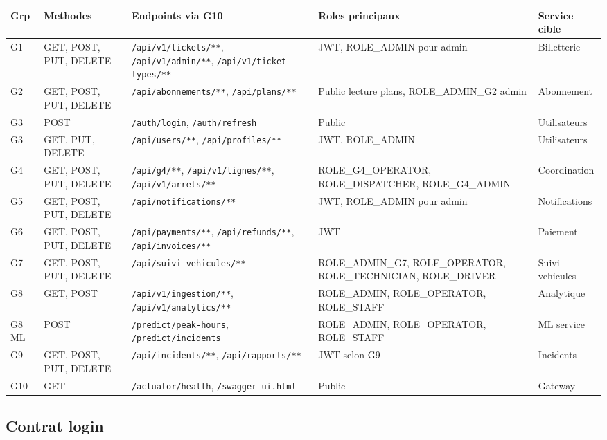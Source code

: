 \documentclass[12pt,a4paper]{article}
\begin{document}
\begin{longtable}{p{1.3cm}p{2cm}p{5.4cm}p{3.2cm}p{3.1cm}}
\toprule
\textbf{Grp} & \textbf{Methodes} & \textbf{Endpoints via G10} & \textbf{Roles principaux} & \textbf{Service cible} \\
\midrule
G1 & GET, POST, PUT, DELETE & \texttt{/api/v1/tickets/**}, \texttt{/api/v1/admin/**}, \texttt{/api/v1/ticket-types/**} & JWT, ROLE\_ADMIN pour admin & Billetterie \\
G2 & GET, POST, PUT, DELETE & \texttt{/api/abonnements/**}, \texttt{/api/plans/**} & Public lecture plans, ROLE\_ADMIN\_G2 admin & Abonnement \\
G3 & POST & \texttt{/auth/login}, \texttt{/auth/refresh} & Public & Utilisateurs \\
G3 & GET, PUT, DELETE & \texttt{/api/users/**}, \texttt{/api/profiles/**} & JWT, ROLE\_ADMIN & Utilisateurs \\
G4 & GET, POST, PUT, DELETE & \texttt{/api/g4/**}, \texttt{/api/v1/lignes/**}, \texttt{/api/v1/arrets/**} & ROLE\_G4\_OPERATOR, ROLE\_DISPATCHER, ROLE\_G4\_ADMIN & Coordination \\
G5 & GET, POST, PUT, DELETE & \texttt{/api/notifications/**} & JWT, ROLE\_ADMIN pour admin & Notifications \\
G6 & GET, POST, PUT, DELETE & \texttt{/api/payments/**}, \texttt{/api/refunds/**}, \texttt{/api/invoices/**} & JWT & Paiement \\
G7 & GET, POST, PUT, DELETE & \texttt{/api/suivi-vehicules/**} & ROLE\_ADMIN\_G7, ROLE\_OPERATOR, ROLE\_TECHNICIAN, ROLE\_DRIVER & Suivi vehicules \\
G8 & GET, POST & \texttt{/api/v1/ingestion/**}, \texttt{/api/v1/analytics/**} & ROLE\_ADMIN, ROLE\_OPERATOR, ROLE\_STAFF & Analytique \\
G8 ML & POST & \texttt{/predict/peak-hours}, \texttt{/predict/incidents} & ROLE\_ADMIN, ROLE\_OPERATOR, ROLE\_STAFF & ML service \\
G9 & GET, POST, PUT, DELETE & \texttt{/api/incidents/**}, \texttt{/api/rapports/**} & JWT selon G9 & Incidents \\
G10 & GET & \texttt{/actuator/health}, \texttt{/swagger-ui.html} & Public & Gateway \\
\bottomrule
\end{longtable}

\subsection{Contrat login}
\end{document}
